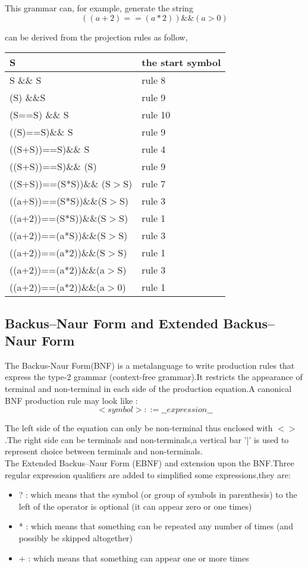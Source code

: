 This grammar can, for example, generate the string 
$$  ((a+2) == (a*2) )\&\& (a > 0)  $$

can be derived from the projection rules as follow,
 
\begin{tabular}{|l|l|}
\hline S & the start symbol\\ 
\hline S \&\& S & rule 8 \\ 
\hline  (S) \&\&S & rule 9\\ 
\hline   (S==S) \&\& S & rule 10 \\ 
\hline  ((S)==S)\&\& S  & rule  9\\ 
\hline ((S+S))==S)\&\& S & rule 4\\
\hline ((S+S))==S)\&\& (S) & rule 9 \\
\hline  ((S+S))==(S*S))\&\& (S$>$S) & rule 7\\
\hline ((a+S))==(S*S))\&\&(S$>$S)  & rule 3\\
\hline ((a+2))==(S*S))\&\&(S$>$S) & rule 1\\
\hline ((a+2))==(a*S))\&\&(S$>$S) & rule 3\\
\hline ((a+2))==(a*2))\&\&(S$>$S) & rule 1\\
\hline ((a+2))==(a*2))\&\&(a$>$S) & rule 3\\
\hline ((a+2))==(a*2))\&\&(a$>$0) & rule 1\\
\hline

\end{tabular} 
 
 


\subsection{Backus–Naur Form and Extended Backus–Naur Form}
The Backus-Naur Form(BNF) is a metalanguage to write  production rules that express the type-2 grammar (context-free grammar).It restricts the appearance of terminal and non-terminal in each side of the production equation.A canonical BNF production rule may look like :
 \[   <symbol> ::= \_\_expression\_\_ \]
 
The left side of the equation can only be non-terminal thus enclosed with $<>$ .The right side can be terminals and non-terminals,a vertical bar '|' is used to represent choice between terminals and non-terminals.\\

The  Extended Backus–Naur Form (EBNF) and extension upon the BNF.Three regular expression qualifiers are added to simplified some expressions,they are:
\begin{itemize}
\item ? : which means that the symbol (or group of symbols in parenthesis) to the left of the operator is
optional (it can appear zero or one times)
\item * : which means that something can be repeated any number of times (and possibly be skipped
altogether)
\item + : which means that something can appear one or more times 
\end{itemize} \cite{aho1986compilers}

